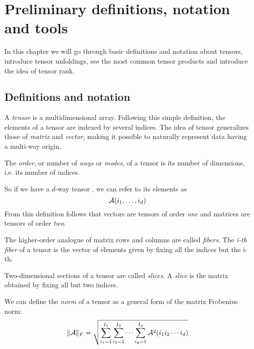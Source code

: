 \chapter{Preliminary definitions, notation and tools}

In this chapter we will go through basic definitions and notation about tensors, introduce tensor unfoldings, see the most common tensor products and introduce the idea of tensor rank.

\section{Definitions and notation}

A \emph{tensor} is a multidimensional array. Following this simple definition, the elements of a tensor are indexed by several indices.
The idea of tensor generalizes those of \emph{matrix} and \emph{vector}, making it possible to naturally represent data having a multi-way origin.

\begin{Def}
  The \emph{order}, or number of \emph{ways} or \emph{modes}, of a tensor is its number of dimensions, i.e. its number of indices.
\end{Def}
So if we have a $d$-way tensor \A, we can refer to its elements as
\begin{equation*}
  \mathcal{A}(i_1,\ldots,i_d)
\end{equation*}
From this definition follows that vectors are tensors of order \emph{one} and matrices are tensors of order \emph{two}.

\begin{Def}
  The higher-order analogue of matrix rows and columns are called \emph{fibers}. The \emph{i-th fiber} of a tensor \A is the vector of elements given by fixing all the indices but the i-th.
\end{Def}

\begin{Def}
  Two-dimensional sections of a tensor are called \emph{slices}. A \emph{slice} is the matrix obtained by fixing all but two indices.
\end{Def}

\begin{Def}
  We can define the \emph{norm} of a tensor as a general form of the matrix Frobenius norm:
  \[
  \|\mathcal{A}\|_F = \sqrt{\sum_{i_1 = 1}^{I_1}\sum_{i_2 = 1}^{I_2}\cdots\sum_{i_d = 1}^{I_d}\mathcal{A}^2(i_1 i_2 \cdots i_d)}
  \]
\end{Def}

